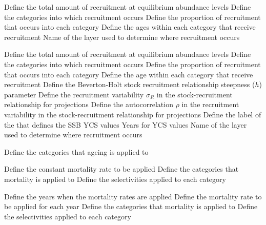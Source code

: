  {Define the total amount of recruitment at equilibrium abundance levels}
 {Define the categories into which recruitment occurs}
 {Define the proportion of recruitment that occurs into each category}
 {Define the ages within each category that receive recruitment}
 {Name of the layer used to determine where recruitment occurs}
\par\textbf{}\par
{} {Define the total amount of recruitment at equilibrium abundance levels}
 {Define the categories into which recruitment occurs}
 {Define the proportion of recruitment that occurs into each category}
 {Define the age within each category that receive recruitment}
 {Define the Beverton-Holt stock recruitment relationship steepness ($h$) parameter}
 {Define the recruitment variability $\sigma_R$ in the stock-recruitment relationship for projections}
 {Define the autocorrelation $\rho$ in the recruitment variability in the stock-recruitment relationship for projections}
 {Define the label of the  that defines the SSB}
 {YCS values}
 {Years for YCS values}
 {Name of the layer used to determine where recruitment occurs}
\par\textbf{}\par
{} {Define the categories that ageing is applied to}
\par\textbf{}\par
{} {Define the constant mortality rate to be applied}
 {Define the categories that mortality is applied to}
 {Define the selectivities applied to each category}
\par\textbf{}\par
{} {Define the years when the mortality rates are applied}
 {Define the mortality rate to be applied for each year}
 {Define the categories that mortality is applied to}
 {Define the selectivities applied to each category}
\par\textbf{}\par
